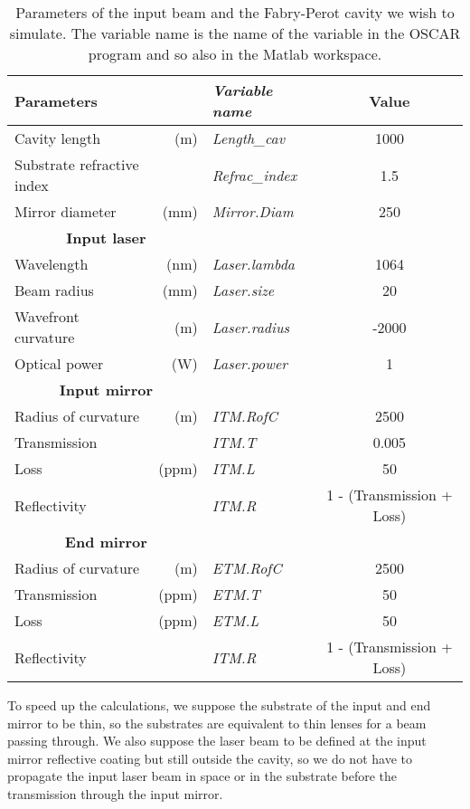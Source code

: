 \begin{table}[tbp]
  \centering
  \caption{\label{tab2:param} Parameters of the input beam and the Fabry-Perot cavity we wish to simulate. The variable name is the name of the variable in the OSCAR program and so also in the Matlab workspace.}
\begin{tabular}{|l r|>{\slshape}l|c|}
  \hline
  {\large\strut} Parameters & & Variable name & Value \\
  \hline
  {\large\strut} Cavity length &(m) & Length\_cav & 1000 \\
  {\large\strut} Substrate refractive index & & Refrac\_index & 1.5 \\
  {\large\strut} Mirror diameter &(mm) & Mirror.Diam & 250 \\
  \hline
  \hline
  \multicolumn{2}{|c|}{{\large\strut} \textbf{Input laser}} \\
  \hline
  {\large\strut} Wavelength &(nm) & Laser.lambda & 1064 \\
  {\large\strut} Beam radius &(mm) & Laser.size & 20 \\
  {\large\strut} Wavefront curvature &(m) & Laser.radius & -2000 \\
  {\large\strut} Optical power &(W) & Laser.power & 1 \\
  \hline
  \hline
  \multicolumn{2}{|c|}{{\large\strut} \textbf{Input mirror}} \\
  \hline
  {\large\strut} Radius of curvature &(m) & ITM.RofC & 2500 \\
  {\large\strut} Transmission & & ITM.T & 0.005 \\
  {\large\strut} Loss &(ppm) & ITM.L & 50 \\
  {\large\strut} Reflectivity & & ITM.R & 1 - (Transmission + Loss) \\
  \hline
  \hline
  \multicolumn{2}{|c|}{{\large\strut} \textbf{End mirror}} \\
  \hline
  {\large\strut} Radius of curvature &(m) & ETM.RofC & 2500 \\
  {\large\strut} Transmission &(ppm) & ETM.T & 50 \\
  {\large\strut} Loss &(ppm) & ETM.L & 50 \\
  {\large\strut} Reflectivity & & ITM.R & 1 - (Transmission + Loss) \\
  \hline
\end{tabular}
\end{table}

To speed up the calculations, we suppose the substrate of the input and end mirror to be thin, so the substrates are equivalent to thin lenses for a beam passing through. We also suppose the laser beam to be defined at the input mirror reflective coating but still outside the cavity, so we do not have to propagate the input laser beam in space or in the substrate before the transmission through the input mirror.

